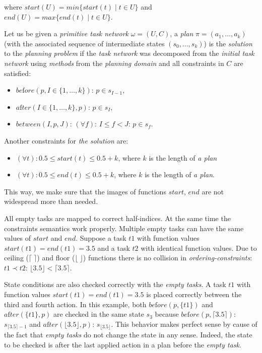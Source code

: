\noindent
where $start(U) = min\{start(t) \; | \; t \in U\}$ and $end(U) = max\{end(t) \; | \; t \in U\}$.

\medskip\noindent
Let us be given a \emph{primitive task network} $\omega = (U, C)$, a \emph{plan} $\pi = (a_1, \dots, a_k)$ (with the associated sequence of intermediate states $(s_0, \dots, s_k)$) is the \emph{solution} to the \emph{planning problem} if the \emph{task network} was decomposed from the \emph{initial task network} using \emph{methods} from the \emph{planning domain} and all constraints in $C$ are satisfied:

\begin{itemize}
    \item $be\text{f}ore(p, I \in \{1, \dots, k\})$: $p \in s_{I - 1}$,

    \item $a\text{f}ter(I \in \{1, \dots, k\}, p)$: $p \in s_{I}$,

    \item $between(I, p, J)$: $(\forall f)$: $I \leq f < J$: $p \in s_f$.
\end{itemize}

\medskip\noindent
Another constraints for \emph{the solution} are:

\begin{itemize}
    \item $(\forall t): 0.5 \leq start(t) \leq 0.5 + k$, where $k$ is the length of \emph{a plan}
    \item $(\forall t): 0.5 \leq end(t) \leq 0.5 + k$,  where $k$ is the length of \emph{a plan}.
\end{itemize}

This way, we make sure that the images of functions $start$, $end$ are not widespread more than needed.

\medskip\noindent
All empty tasks are mapped to correct half-indices. At the same time the constraints semantics work properly. Multiple empty tasks can have the same values of $start$ and $end$. Suppose a task $t1$ with function values $start(t1) = end(t1) = 3.5$ and a task $t2$ with identical function values. Due to ceiling ($\lceil \; \rceil$) and floor ($\lfloor \; \rfloor$) functions there is no collision in \emph{ordering-constraints}: $t1 \prec t2$: $\lfloor 3.5 \rfloor < \lceil 3.5 \rceil$. 

\noindent
State conditions are also checked correctly with the \emph{empty tasks}. A task $t1$ with function values $start(t1) = end(t1) = 3.5$ is placed correctly between the third and fourth action. In this example, both $be\text{f}ore(p, \{ t1 \})$ and $a\text{f}ter(\{ t1 \}, p)$ are checked in the same state $s_3$ because $be\text{f}ore(p, \lceil 3.5 \rceil)$: $s_{\lceil 3.5 \rceil - 1}$ and $a\text{f}ter(\lfloor 3.5 \rfloor, p)$: $s_{\lfloor 3.5 \rfloor}$. This behavior makes perfect sense by cause of the fact that \emph{empty tasks} do not change the state in any sense. Indeed, the state to be checked is after the last applied action in a plan before the \emph{empty task}.

